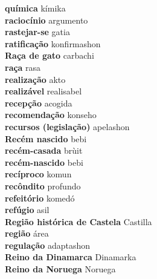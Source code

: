 \textbf{ química  } kímika \\
\textbf{ raciocínio  } argumento \\
\textbf{ rastejar-se  } gatia \\
\textbf{ ratificação  } konfirmashon \\
\textbf{ Raça de gato  } carbachi \\
\textbf{ raça  } rasa \\
\textbf{ realização  } akto \\
\textbf{ realizável  } realisabel \\
\textbf{ recepção  } acogida \\
\textbf{ recomendação  } konseho \\
\textbf{ recursos (legislação)  } apelashon \\
\textbf{ Recém nascido  } bebi \\
\textbf{ recém-casada  } brùit \\
\textbf{ recém-nascido  } bebi \\
\textbf{ recíproco  } komun \\
\textbf{ recôndito  } profundo \\
\textbf{ refeitório  } komedó \\
\textbf{ refúgio  } asil \\
\textbf{ Região histórica de Castela  } Castilla \\
\textbf{ região  } área \\
\textbf{ regulação  } adaptashon \\
\textbf{ Reino da Dinamarca  } Dinamarka \\
\textbf{ Reino da Noruega  } Noruega \\
